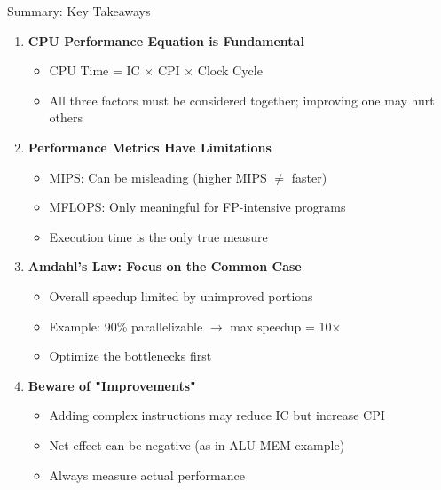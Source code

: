 \documentclass[aspectratio=169,12pt]{beamer}
\begin{document}
\begin{frame}{Summary: Key Takeaways}
\begin{enumerate}
    \item \textbf{CPU Performance Equation is Fundamental}
    \begin{itemize}
        \item CPU Time = IC $\times$ CPI $\times$ Clock Cycle
        \item All three factors must be considered together; improving one may hurt others
    \end{itemize}
    
    \item \textbf{Performance Metrics Have Limitations}
    \begin{itemize}
        \item MIPS: Can be misleading (higher MIPS $\neq$ faster)
        \item MFLOPS: Only meaningful for FP-intensive programs
        \item Execution time is the only true measure
    \end{itemize}
    
    \item \textbf{Amdahl's Law: Focus on the Common Case}
    \begin{itemize}
        \item Overall speedup limited by unimproved portions
        \item Example: 90\% parallelizable $\rightarrow$ max speedup = 10×
        \item Optimize the bottlenecks first
    \end{itemize}
    
    \item \textbf{Beware of "Improvements"}
    \begin{itemize}
        \item Adding complex instructions may reduce IC but increase CPI
        \item Net effect can be negative (as in ALU-MEM example)
        \item Always measure actual performance
    \end{itemize}
\end{enumerate}
\end{frame}
\end{document}
